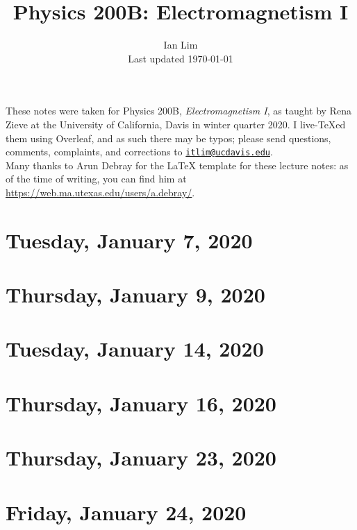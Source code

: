 \documentclass{../mynotes}
\begin{document}
\title{Physics 200B: Electromagnetism I}
\author{Ian Lim\\ Last updated \today}
\maketitle
{\small\noindent These notes were taken for Physics 200B, \emph{Electromagnetism I}, as taught by Rena Zieve at the University of California, Davis in winter quarter 2020. I live-\TeX ed them using Overleaf, and as such there may be typos; please send questions, comments, complaints, and corrections to 
\href{mailto:itlim@ucdavis.edu?subject=200B\%20Lecture\%20Notes}{\texttt{itlim@ucdavis.edu}}.\\
Many thanks to Arun Debray for the {\LaTeX} template for these lecture notes: as of the time of writing, you can find him at \url{https://web.ma.utexas.edu/users/a.debray/}.}

\tableofcontents

\section{Tuesday, January 7, 2020}
	
\section{Thursday, January 9, 2020}
    
    
\section{Tuesday, January 14, 2020}
    
\section{Thursday, January 16, 2020}
    
    
\section{Thursday, January 23, 2020}
    
\section{Friday, January 24, 2020}
    
    
\end{document}
